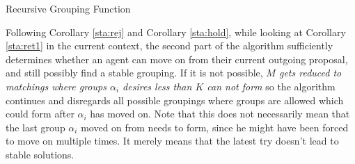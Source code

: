 \documentclass{elsarticle}
\begin{document}
\begin{algorithm}[H]
    \caption{Recursive Grouping Function \label{alg:rec}}
\end{algorithm}

Following Corollary \ref{sta:rej} and Corollary \ref{sta:hold}, while looking at Corollary \ref{sta:ret1} in the current context, the second part of the algorithm sufficiently determines whether an agent can move on from their current outgoing proposal, and still possibly find a stable grouping. If it is not possible, \textit{$M$ gets reduced to matchings where groups $\alpha_i$ desires less than $K$ can not form} so the algorithm continues and disregards all possible groupings where groups are allowed which could form after $\alpha_i$ has moved on. Note that this does not necessarily mean that the last group $\alpha_i$ moved on from needs to form, since he might have been forced to move on multiple times. It merely means that the latest try doesn't lead to stable solutions.
\end{document}
